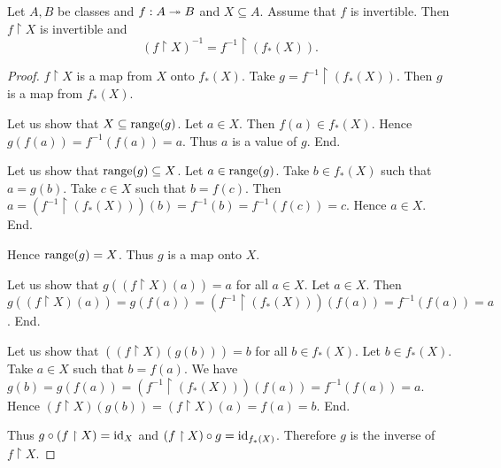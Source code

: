\documentclass[../set-theory.tex]{subfiles}
\begin{document}
  \begin{forthel}
    \begin{proposition}
      Let $A, B$ be classes and $f : A \twoheadrightarrow B$ and $X \subseteq A$.
      Assume that $f$ is invertible.
      Then $f \restriction X$ is invertible and
      \[ (f\restriction X)^{-1} = f^{-1} \restriction (f_{*}(X)). \]
    \end{proposition}
    \begin{proof}
      $f \restriction X$ is a map from $X$ onto $f_{*}(X)$.
      Take $g = f^{-1} \restriction (f_{*}(X))$.
      Then $g$ is a map from $f_{*}(X)$.

      Let us show that $X \subseteq \operatorname{range}(g)$.
        Let $a \in X$.
        Then $f(a) \in f_{*}(X)$.
        Hence $g(f(a)) = f^{-1}(f(a)) = a$.
        Thus $a$ is a value of $g$.
      End.

      Let us show that $\operatorname{range}(g) \subseteq X$.
        Let $a \in \operatorname{range}(g)$.
        Take $b \in f_{*}(X)$ such that $a = g(b)$.
        Take $c \in X$ such that $b = f(c)$.
        Then $a = (f^{-1} \restriction (f_{*}(X)))(b) = f^{-1}(b) = f^{-1}(f(c)) = c$.
        Hence $a \in X$.
      End.

      Hence $\operatorname{range}(g) = X$.
      Thus $g$ is a map onto $X$.

      Let us show that $g((f \restriction X)(a)) = a$ for all $a \in X$.
        Let $a \in X$.
        Then $g((f \restriction X)(a)) = g(f(a)) = (f^{-1} \restriction (f_{*}(X)))(f(a)) = f^{-1}(f(a)) = a$.
      End.

      Let us show that $((f \restriction X)(g(b))) = b$ for all $b \in f_{*}(X)$.
        Let $b \in f_{*}(X)$.
        Take $a \in X$ such that $b = f(a)$.
        We have $g(b) = g(f(a)) = (f^{-1} \restriction (f_{*}(X)))(f(a)) = f^{-1}(f(a)) = a$.
        Hence $(f \restriction X)(g(b)) = (f \restriction X)(a) = f(a) = b$.
      End.

      Thus $g \circ (f \restriction X) = \operatorname{id}_{X}$ and $(f \restriction X) \circ g = \operatorname{id}_{f_{*}(X)}$.
      Therefore $g$ is the inverse of $f \restriction X$.
    \end{proof}
  \end{forthel}
\end{document}
